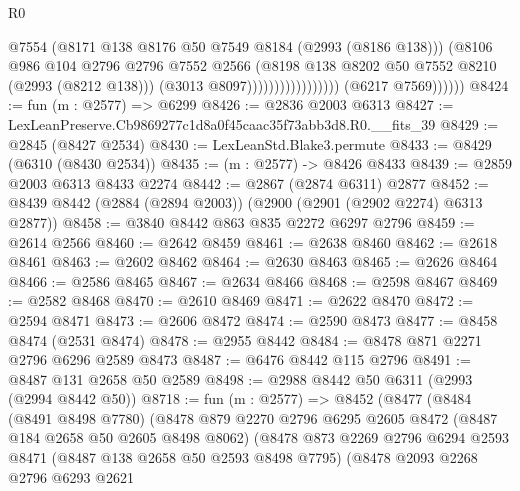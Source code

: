 \begin{lexlean}{R0}
\begin{coremodule}
                                            @7554
                                            (@8171 @138 @8176 @50 @7549 @8184 (@2993 (@8186 @138)))
                                            (@8106
                                              @986
                                              @104
                                              @2796
                                              @2796
                                              @7552
                                              @2566
                                              (@8198
                                                @138
                                                @8202
                                                @50
                                                @7552
                                                @8210
                                                (@2993 (@8212 @138)))
                                              (@3013 @8097)))))))))))))))))
              (@6217 @7569))))))
@8424 := fun (m : @2577) => @6299
@8426 := @2836 @2003 @6313
@8427 := LexLeanPreserve.Cb9869277c1d8a0f45caac35f73abb3d8.R0.__fits_39
@8429 := @2845 (@8427 @2534)
@8430 := LexLeanStd.Blake3.permute
@8433 := @8429 (@6310 (@8430 @2534))
@8435 := (m : @2577) -> @8426 @8433
@8439 := @2859 @2003 @6313 @8433 @2274
@8442 := @2867 (@2874 @6311) @2877
@8452 := @8439 @8442 (@2884 (@2894 @2003)) (@2900 (@2901 (@2902 @2274) @6313 @2877))
@8458 := @3840 @8442 @863 @835 @2272 @6297 @2796
@8459 := @2614 @2566
@8460 := @2642 @8459
@8461 := @2638 @8460
@8462 := @2618 @8461
@8463 := @2602 @8462
@8464 := @2630 @8463
@8465 := @2626 @8464
@8466 := @2586 @8465
@8467 := @2634 @8466
@8468 := @2598 @8467
@8469 := @2582 @8468
@8470 := @2610 @8469
@8471 := @2622 @8470
@8472 := @2594 @8471
@8473 := @2606 @8472
@8474 := @2590 @8473
@8477 := @8458 @8474 (@2531 @8474)
@8478 := @2955 @8442
@8484 := @8478 @871 @2271 @2796 @6296 @2589 @8473
@8487 := @6476 @8442 @115 @2796
@8491 := @8487 @131 @2658 @50 @2589
@8498 := @2988 @8442 @50 @6311 (@2993 (@2994 @8442 @50))
@8718 := fun (m : @2577) =>
  @8452
    (@8477
      (@8484
        (@8491 @8498 @7780)
        (@8478
          @879
          @2270
          @2796
          @6295
          @2605
          @8472
          (@8487 @184 @2658 @50 @2605 @8498 @8062)
          (@8478
            @873
            @2269
            @2796
            @6294
            @2593
            @8471
            (@8487 @138 @2658 @50 @2593 @8498 @7795)
            (@8478
              @2093
              @2268
              @2796
              @6293
              @2621

\end{coremodule}
\end{lexlean}
